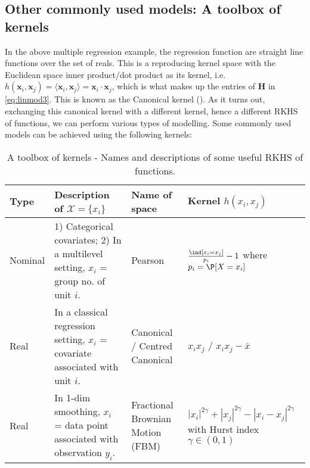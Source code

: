 \subsection{Other commonly used models: A toolbox of kernels}
\label{sec:toolbox}

In the above multiple regression example, the regression function are straight line functions over the set of reals. This is a reproducing kernel space with the Euclidean space inner product/dot product as its kernel, i.e. $h(\mathbf x_i, \mathbf x_j) = \langle\mathbf x_i, \mathbf x_j\rangle = \mathbf x_i \cdot \mathbf x_j$, which is what makes up the entries of $\mathbf H$ in \eqref{eq:linmod3}. This is known as the Canonical kernel (\citealp{Bergsma2014}). As it turns out, exchanging this canonical kernel with a different kernel, hence a different RKHS of functions, we can perform various types of modelling. Some commonly used models can be achieved using the following kernels:

\begin{table}[H]
\centering
\begin{tabular}{m{1.4cm} m{3.8cm} m{3.5cm} m{3.8cm}}
\toprule
Type 	
&Description of $\mathcal X \!\!=\!\! \{x_i\} $		
&Name of space		
&Kernel $h( x_i,  x_j)$ \\
\midrule

Nominal		
&\footnotesize{1) Categorical covariates; \newline 2) In a multilevel setting, $x_i$ = group no. of unit $i$.} 
&Pearson	
&$\frac{\ind[x_i=x_j]}{p_i} - 1$ \newline \footnotesize{where $p_i = \P[X = x_i]$} 
\\

Real		
&\footnotesize{In a classical regression setting, $x_i$ = covariate associated with unit $i$.} 
&Canonical / \newline Centred Canonical	&$x_ix_j$ / \newline $x_ix_j - \bar x$ 
\\

Real		&\footnotesize{In 1-dim smoothing, $x_i$ = data point associated with observation $y_i$.}
&Fractional Brownian Motion (FBM)	&\footnotesize{$|x_i|^{2\gamma} + |x_j|^{2\gamma} - |x_i - x_j|^{2\gamma}$ with Hurst index $\gamma \in (0,1)$}
\\

\bottomrule
\end{tabular}
\label{tab:toolbox} \vspace{-0.5mm} 
\caption{A toolbox of kernels - Names and descriptions of some useful RKHS of functions.}
\end{table}

